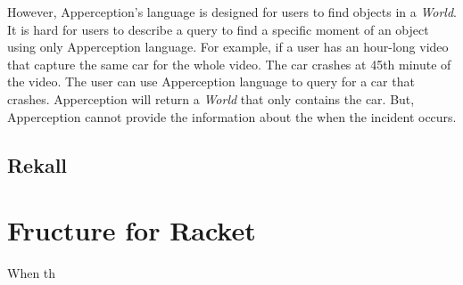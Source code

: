 However, Apperception's language is designed for users to find objects in a \emph{World}.
It is hard for users to describe a query to find a specific moment of an object using only Apperception language.
For example, if a user has an hour-long video that capture the same car for the whole video.
The car crashes at 45th minute of the video.
The user can use Apperception language to query for a car that crashes.
Apperception will return a \emph{World} that only contains the car.
But, Apperception cannot provide the information about the when the incident occurs.


\subsection{Rekall}


\section{Fructure for Racket}
When th